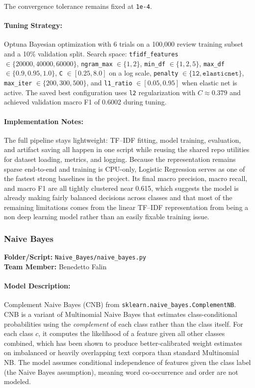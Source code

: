 \documentclass[12pt]{article}
\begin{document}
The convergence tolerance remains fixed at \texttt{1e-4}.


\paragraph{Tuning Strategy:}
Optuna Bayesian optimization with 6 trials on a 100,000 review training subset and a 10\% validation split. Search space: \texttt{tfidf\_features} $\in \{20000, 40000, 60000\}$, \texttt{ngram\_max} $\in \{1, 2\}$, \texttt{min\_df} $\in \{1, 2, 5\}$, \texttt{max\_df} $\in \{0.9, 0.95, 1.0\}$, \texttt{C} $\in [0.25, 8.0]$ on a log scale, \texttt{penalty} $\in \{\texttt{l2}, \texttt{elasticnet}\}$, \texttt{max\_iter} $\in \{200, 300, 500\}$, and \texttt{l1\_ratio} $\in [0.05, 0.95]$ when elastic net is active. The saved best configuration uses \texttt{l2} regularization with $C \approx 0.379$ and achieved validation macro F1 of 0.6002 during tuning.


\paragraph{Implementation Notes:}
The full pipeline stays lightweight: TF--IDF fitting, model training, evaluation, and artifact saving all happen in one script while reusing the shared repo utilities for dataset loading, metrics, and logging. Because the representation remains sparse end-to-end and training is CPU-only, Logistic Regression serves as one of the fastest strong baselines in the project. Its final macro precision, macro recall, and macro F1 are all tightly clustered near 0.615, which suggests the model is already making fairly balanced decisions across classes and that most of the remaining limitations comes from the linear TF--IDF representation from being a non deep learning model rather than an easily fixable training issue.


\subsubsection{Naive Bayes}
\textbf{Folder/Script:} \texttt{Naive\_Bayes/naive\_bayes.py}\\
\textbf{Team Member:} Benedetto Falin

\paragraph{Model Description:}
Complement Naive Bayes (CNB) from \texttt{sklearn.naive\_bayes.ComplementNB}. CNB is a variant of Multinomial Naive Bayes that estimates class-conditional probabilities using the \textit{complement} of each class rather than the class itself. For each class $c$, it computes the likelihood of a feature given all other classes combined, which has been shown to produce better-calibrated weight estimates on imbalanced or heavily overlapping text corpora than standard Multinomial NB. The model assumes conditional independence of features given the class label (the Naive Bayes assumption), meaning word co-occurrence and order are not modeled.
\end{document}
